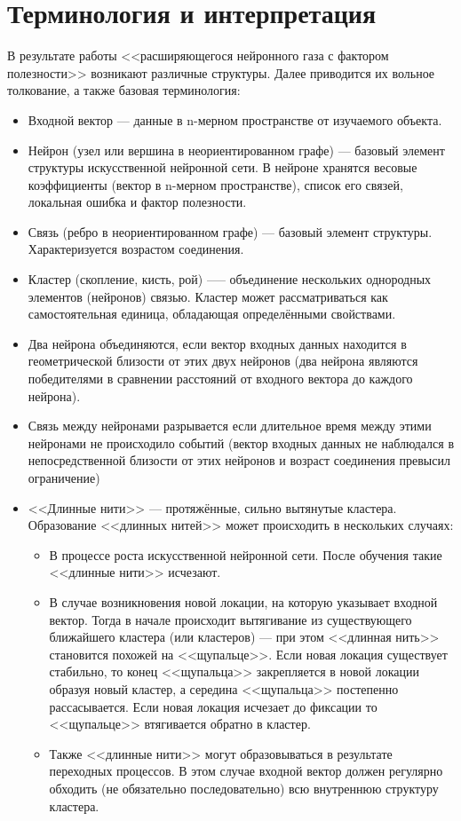 \documentclass[unicode, 12pt, a4paper,oneside,fleqn]{article}
\begin{document}
\section{Терминология и интерпретация}
В результате работы <<расширяющегося нейронного газа с фактором
полезности>> возникают различные структуры. Далее приводится их
вольное толкование, а также базовая терминология:

\begin{itemize}
\item Входной вектор --- данные в n-мерном пространстве от изучаемого
  объекта.
\item Нейрон (узел или вершина в неориентированном графе) --- базовый
  элемент структуры искусственной нейронной сети. В нейроне хранятся
  весовые коэффициенты (вектор в n-мерном пространстве), список его
  связей, локальная ошибка и фактор полезности.
\item Связь (ребро в неориентированном графе) --- базовый элемент
  структуры. Характеризуется возрастом соединения.
\item Кластер (скопление, кисть, рой) --— объединение нескольких
  однородных элементов (нейронов) связью. Кластер может рассматриваться как
  самостоятельная единица, обладающая определёнными свойствами.
\item Два нейрона объединяются, если вектор входных данных находится в
  геометрической близости от этих двух нейронов (два нейрона являются
  победителями в сравнении расстояний от входного вектора до каждого
  нейрона).
\item Связь между нейронами разрывается если длительное время между
  этими нейронами не происходило событий (вектор входных данных не
  наблюдался в непосредственной близости от этих нейронов и возраст
  соединения превысил ограничение)
\item <<Длинные нити>> --- протяжённые, сильно вытянутые кластера.
  Образование <<длинных нитей>> может происходить в нескольких случаях:
  \begin{itemize}
  \item В процессе роста искусственной нейронной сети. После обучения
    такие <<длинные нити>> исчезают.
  \item В случае возникновения новой локации, на которую указывает
    входной вектор. Тогда в начале происходит вытягивание из
    существующего ближайшего кластера (или кластеров) --- при этом
    <<длинная нить>> становится похожей на <<щупальце>>. Если новая
    локация существует стабильно, то конец <<щупальца>> закрепляется в
    новой локации образуя новый кластер, а середина <<щупальца>>
    постепенно рассасывается. Если новая локация исчезает до фиксации
    то <<щупальце>> втягивается обратно в кластер.
  \item Также <<длинные нити>> могут образовываться в результате
    переходных процессов. В этом случае входной вектор должен
    регулярно обходить (не обязательно последовательно) всю внутреннюю
    структуру кластера.
  \end{itemize}
\end{itemize}
\end{document}
